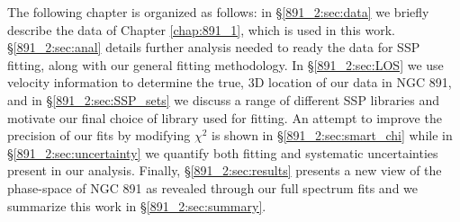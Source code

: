 
The following chapter is organized as follows: in
\S\ref{891_2:sec:data} we briefly describe the data of Chapter
\ref{chap:891_1}, which is used in this work. \S\ref{891_2:sec:anal}
details further analysis needed to ready the data for SSP fitting,
along with our general fitting methodology. In \S\ref{891_2:sec:LOS}
we use velocity information to determine the true, 3D location of our
data in NGC 891, and in \S\ref{891_2:sec:SSP_sets} we discuss a range
of different SSP libraries and motivate our final choice of library
used for fitting. An attempt to improve the precision of our fits by
modifying $\chi^2$ is shown in \S\ref{891_2:sec:smart_chi} while in
\S\ref{891_2:sec:uncertainty} we quantify both fitting and systematic
uncertainties present in our analysis. Finally,
\S\ref{891_2:sec:results} presents a new view of the phase-space of
NGC 891 as revealed through our full spectrum fits and we summarize
this work in \S\ref{891_2:sec:summary}.
